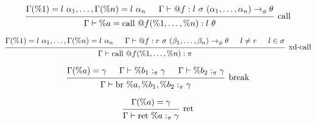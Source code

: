 \documentclass{article}
\begin{document}
\[
\begin{prooftree}
    \hypo{\Gamma(\%1) = l\ \alpha_1, \dots, \Gamma(\%n) = l\ \alpha_n}
    \hypo{\Gamma \vdash @f : l\ \sigma\ (\alpha_1, \dots, \alpha_n) \rightarrow_\phi \theta}
    \infer2[call]{\Gamma \vdash \%a = \text{call } @f(\%1, \dots, \%n) : l\ \theta}
\end{prooftree}
\]

\[
\begin{prooftree}
    \hypo{\Gamma(\%1) = l\ \alpha_1, \dots, \Gamma(\%n) = l\ \alpha_n}
    \hypo{\Gamma \vdash @f : r\ \sigma\ (\beta_1, \dots, \beta_n) \rightarrow_\phi \theta}
    \hypo{l \neq r}
    \hypo{l \in \sigma}
    \infer4[xd-call]{\Gamma \vdash \text{call } @f(\%1, \dots, \%n) : \pi}
\end{prooftree}
\]

\[
\begin{prooftree}
    \hypo{\Gamma(\%a) = \gamma}
    \hypo{\Gamma \vdash \%b_1 :_\pi \gamma} 
    \hypo{\Gamma \vdash \%b_2 :_\pi \gamma} 
    \infer3[break]{\Gamma \vdash \text{br }\%a, \%b_1, \%b_2 :_\pi \gamma}
\end{prooftree}
\]

\[
\begin{prooftree}
    \hypo{\Gamma(\%a) = \gamma}
    \infer1[ret]{\Gamma \vdash \text{ret }\%a :_\pi \gamma}
\end{prooftree}
\]
\end{document}

